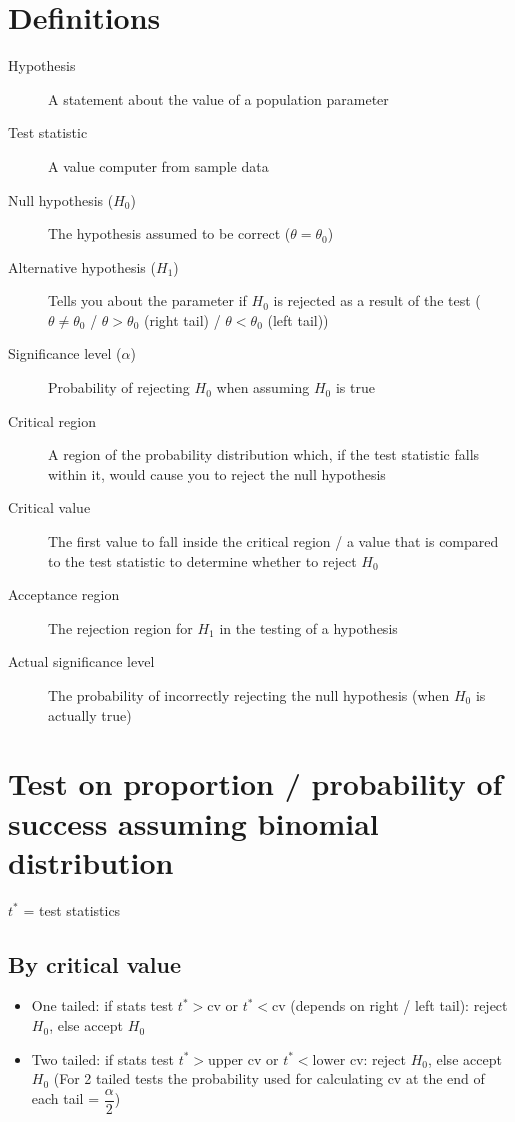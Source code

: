 \section{Definitions}
\begin{description}
	\item[Hypothesis] A statement about the value of a population parameter
	\item[Test statistic] A value computer from sample data
	\item[Null hypothesis ($H_0$)] The hypothesis assumed to be correct ($\theta=\theta_0$)
	\item[Alternative hypothesis ($H_1$)] Tells you about the parameter if $H_0$ is rejected as a result of the test ($\theta \neq \theta_0$ / $\theta>\theta_0$ (right tail) / $\theta<\theta_0$ (left tail))
	\item[Significance level ($\alpha$)] Probability of rejecting $H_0$ when assuming $H_0$ is true
	\item[Critical region] A region of the probability distribution which, if the test statistic falls within it, would cause you to reject the null hypothesis
	\item[Critical value] The first value to fall inside the critical region / a value that is compared to the test statistic to determine whether to reject $H_0$
	\item[Acceptance region] The rejection region for $H_1$ in the testing of a hypothesis
	\item[Actual significance level] The probability of incorrectly rejecting the null hypothesis (when $H_0$ is actually true)
\end{description}

\section{Test on proportion / probability of success assuming binomial distribution}
$t^*$ = test statistics
\subsection{By critical value}
\begin{itemize}
	\item One tailed: if stats test $t^* > \text{cv}$ or $t^* < \text{cv}$ (depends on right / left tail): reject $H_0$, else accept $H_0$
	\item Two tailed: if stats test $t^* > \text{upper cv}$ or $t^* < \text{lower cv}$: reject $H_0$, else accept $H_0$ (For 2 tailed tests the probability used for calculating cv at the end of each tail = $\dfrac{\alpha}{2}$)
\end{itemize}


